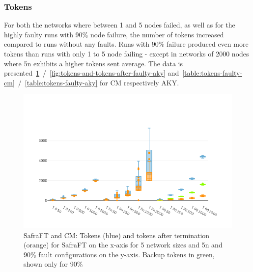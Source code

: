 \subsubsection{Tokens}
\label{ssec:tokens-faulty}
For both the networks where between 1 and 5 nodes failed, as well as for the highly faulty runs with 90\% node failure, the number of tokens increased compared to runs without any faults.
Runs with 90\% failure produced even more tokens than runs with only 1 to 5 node failing - except in networks of 2000 nodes where 5n exhibits a higher tokens sent average.
The data is presented~\cref{fig:tokens-and-tokens-after-faulty-cm}~/~\ref{fig:tokens-and-tokens-after-faulty-aky} and~\cref{table:tokens-faulty-cm}~/~\ref{table:tokens-faulty-aky} for CM respectively AKY.

\begin{figure}
	\includegraphics{figures/tokens-faulty-cm.png}
	\caption{SafraFT and CM: Tokens (blue) and tokens after termination (orange) for SafraFT on the x-axis for 5 network sizes and 5n and 90\% fault configurations on the y-axis.        Backup tokens in green, shown only for 90\%}
	\label{fig:tokens-and-tokens-after-faulty-cm}
\end{figure}

